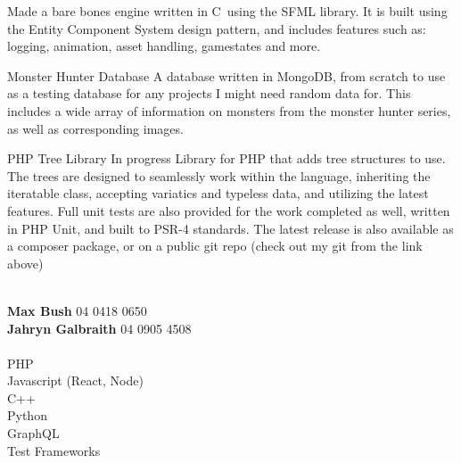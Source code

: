 \documentclass[9pt]{developercv}
\newcommand{\CC}{C\nolinebreak\hspace{-.05em}\raisebox{.4ex}{\tiny\bf +}\nolinebreak\hspace{-.10em}\raisebox{.4ex}{\tiny\bf +}}
\def\CC{{C\nolinebreak[4]\hspace{-.05em}\raisebox{.4ex}{\tiny\bf ++}}}
\begin{document}
\begin{minipage}[t]{0.6\textwidth}
\begin{entrylist}
				{}
				{Made a bare bones engine written in \CC \ using the SFML library. It is built using the Entity Component System design pattern, and includes features such as: logging, animation, asset handling, gamestates and more.}
		\end{entrylist}
		\begin{entrylist}
			\entry
				{\vphantom{1.0}}
				{Monster Hunter Database}
				{}
				{A database written in MongoDB, from scratch to use as a testing database for any projects I might need random data for. This includes a wide array of information on monsters from the monster hunter series, as well as corresponding images.}
		\end{entrylist}
		\begin{entrylist}
			\entry
				{\vphantom{1.0}}
				{PHP Tree Library}
				{}
				{In progress Library for PHP that adds tree structures to use. The trees are designed to seamlessly work within the language, inheriting the iteratable class, accepting variatics and typeless data, and utilizing the latest features. Full unit tests are also provided for the work completed as well, written in PHP Unit, and built to PSR-4 standards. The latest release is also available as a composer package, or on a public git repo (check out my git from the link above)}
		\end{entrylist}
	\end{minipage}
\begin{minipage}[t]{0.1\textwidth}
\hphantom{0.1}
\end{minipage}
	\begin{minipage}[t]{0.3\textwidth}
		\\
		\textbf{Max Bush} 04 0418 0650\\
		\textbf{Jahryn Galbraith} 04 0905 4508\\

		\\
		{PHP}\\
		{Javascript (React, Node)}\\
		{C++}\\
		{Python}\\
		{GraphQL}\\
		{Test Frameworks}\\

		
	\end{minipage}
\end{document}
